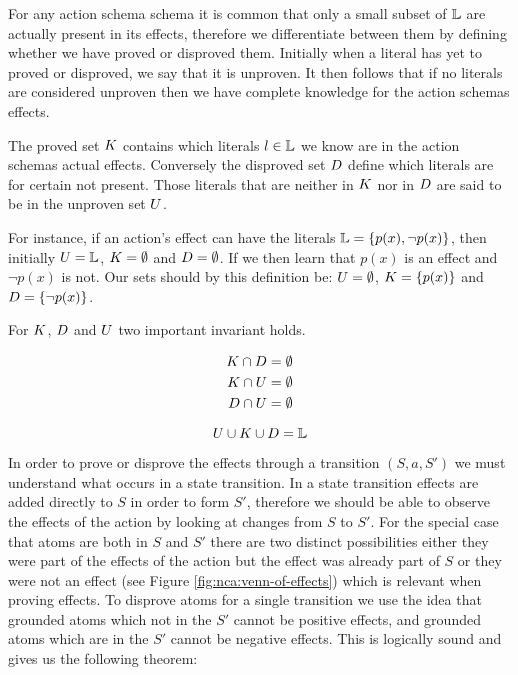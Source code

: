 \documentclass[../Master.tex]{subfiles}
\begin{document}
For any action schema schema it is common that only a small subset of $\mathbb{L}$ are actually present in its effects, 
therefore we differentiate between them by defining whether we have proved or disproved them. 
Initially when a literal has yet to proved or disproved, we say that it is unproven. 
It then follows that if no literals are considered unproven then we have complete knowledge for the action schemas effects.


\begin{definition} 
	The proved set $K$ contains which literals  $l \in \mathbb{L}$ we know are in the action schemas actual effects.
	Conversely the disproved set $D$ define which literals are for certain not present.
	Those literals that are neither in $K$ nor in $D$ are said to be in the unproven set $U$.
	
	For instance, if an action's effect can have the literals $\mathbb{L} = \{p(x), \neg p(x)\}$, 
	then initially $U = \mathbb{L}$, $K = \emptyset$ and $D = \emptyset$. 
	If we then learn that $p(x)$ is an effect and $\neg p(x)$ is not. 
	Our sets should by this definition be: $U = \emptyset$, $K = \{p(x)\}$ and $D = \{\neg p(x)\}$. 
	
\end{definition}

For $K$, $D$ and $U$ two important invariant holds.

\begin{invariant}
	\begin{equation*}
		\begin{split}
		K \cap D & = \emptyset  \\ 
		K \cap U &= \emptyset \\
		D \cap U &= \emptyset
		\end{split}
	\end{equation*}
\end{invariant}

\begin{invariant}[Completeness]
	\begin{equation*}
		U \cup K \cup D = \mathbb{L}
	\end{equation*}
\end{invariant}

In order to prove or disprove the effects through a transition $(S,a,S')$ we must understand what occurs in a state transition.
In a state transition effects are added directly to $S$ in order to form $S'$, therefore we should be able to observe the effects of the action by looking at changes from $S$ to $S'$.  For the special case that atoms are both in $S$ and $S'$ there are two distinct possibilities either they were part of the effects of the action but the effect was already part of $S$ or they were not an effect (see Figure \ref{fig:nca:venn-of-effects}) which is relevant when proving effects. 
To disprove atoms for a single transition we use the idea that grounded atoms which not in the $S'$ cannot be positive effects, and grounded atoms which are in the $S'$ cannot be negative effects. 
This is logically sound and gives us the following theorem:
\end{document}
